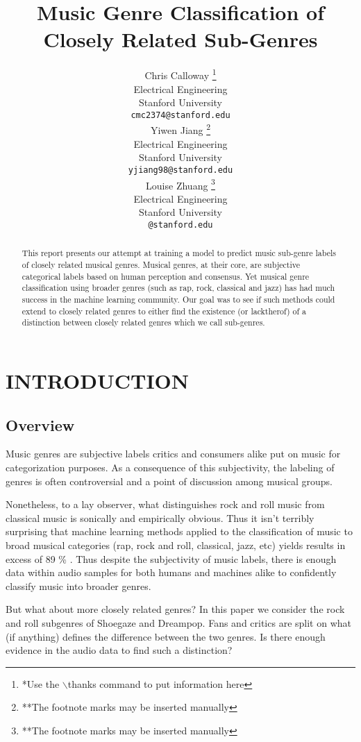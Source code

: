 \documentclass[letterpaper, 12 pt, conference]{ieeeconf}  %
\title{\LARGE \bf
Music Genre Classification of Closely Related Sub-Genres 
}
\author{ \parbox{2 in}{\centering Chris Calloway
        \thanks{*Use the $\backslash$thanks command to put information here}\\
        Electrical Engineering\\
       Stanford University\\
        {\tt\small cmc2374@stanford.edu}}
        \hspace*{ 0.5 in}
        \parbox{2 in}{ \centering Yiwen Jiang
        \thanks{**The footnote marks may be inserted manually}\\
        Electrical Engineering \\
        Stanford University\\
        {\tt\small yjiang98@stanford.edu}}
          \hspace*{ 0.5 in}
        \parbox{2 in}{ \centering Louise Zhuang
        \thanks{**The footnote marks may be inserted manually}\\
        Electrical Engineering \\
        Stanford University\\
        {\tt\small @stanford.edu}}
}
\begin{document}
\maketitle
\thispagestyle{empty}
\pagestyle{empty}


\begin{abstract}

This report presents our attempt at training a model to predict music sub-genre labels of closely related musical genres. Musical genres, at their core, are subjective categorical labels based on human perception and consensus. Yet musical genre classification using broader genres (such as rap, rock, classical and jazz) has had much success in the machine learning community. Our goal was to see if such methods could extend to closely related genres to either find the existence (or lacktherof) of a distinction between closely related genres which we call sub-genres.




\end{abstract}


\section{INTRODUCTION}

\subsection{Overview}

Music genres are subjective labels critics and consumers alike put on music for categorization purposes. 
As a consequence of this subjectivity, the labeling of genres is often controversial and a point of discussion among musical groups. 

Nonetheless, to a lay observer, what distinguishes rock and roll music from classical music is sonically and empirically obvious. Thus it isn't terribly surprising that machine learning methods applied to the classification of music to broad musical categories (rap, rock and roll, classical, jazz, etc) yields results in excess of 89 \% \cite{c1} \cite{c2} \cite{c3}. Thus despite the subjectivity of music labels, there is enough data within audio samples for both humans and machines alike to confidently classify music into broader genres.

But what about more closely related genres? In this paper we consider the rock and roll subgenres of Shoegaze and Dreampop. Fans and critics are split on what (if anything) defines the difference between the two genres. Is there enough evidence in the audio data to find such a distinction? 
\end{document}

